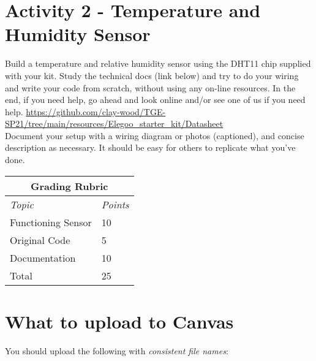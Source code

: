 \documentclass[10pt]{article}
\begin{document}
 \clearpage
 
 
 
\section*{Activity 2 - Temperature and Humidity Sensor}

Build a temperature and relative humidity sensor using the DHT11 chip supplied with your kit.  Study the technical docs (link below) and try to do your wiring and write your code from scratch, without using any on-line resources.  In the end, if you need help, go ahead and look online and/or see one of us if you need help. \url{https://github.com/clay-wood/TGE-SP21/tree/main/resources/Elegoo_starter_kit/Datasheet}\\

\noindent Document your setup with a wiring diagram or photos (captioned), and concise description as necessary. It should be easy for others to replicate what you've done. 


\begin{table}[h!]
	\footnotesize
	\centering
	\begin{tabular}{@{}ll@{}}
		\multicolumn{2}{c}{\textbf{Grading Rubric}} \\ \midrule 
		\multicolumn{1}{l}{\textit{Topic}}   & \textit{Points}   \\ \midrule 
		Functioning Sensor                   & 10       \\ \midrule
		Original Code            & 5       \\ \midrule
		Documentation            & 10       \\ \midrule
		Total                            & 25       \\ \bottomrule
	\end{tabular}
\end{table}


\section*{What to upload to Canvas}
You should upload the following with \textit{consistent file names}:
\end{document}
